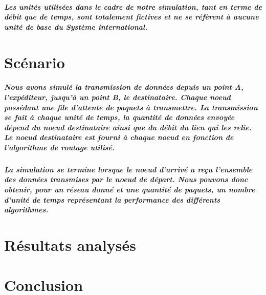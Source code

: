 \documentclass{report}
\begin{document}
\paragraph{Les unités utilisées dans le cadre de notre simulation, tant en terme de débit que de temps, sont totalement fictives et ne se réfèrent à aucune unité de base du Système international.}

\chapter{Scénario}

\paragraph{Nous avons simulé la transmission de données depuis un point A, l'expéditeur, jusqu'à un point B, le destinataire. Chaque noeud possédant une file d'attente de paquets à transmettre. La transmission se fait à chaque unité de temps, la quantité de données envoyée dépend du noeud destinataire ainsi que du débit du lien qui les relie. Le noeud destinataire est fourni à chaque noeud en fonction de l'algorithme de routage utilisé.}

\paragraph{La simulation se termine lorsque le noeud d'arrivé a reçu l'ensemble des données transmises par le noeud de départ. Nous pouvons donc obtenir, pour un réseau donné et une quantité de paquets, un nombre d'unité de temps représentant la performance des différents algorithmes.}

\paragraph{}

\chapter{Résultats analysés}

\paragraph{}

\chapter{Conclusion}

\paragraph{}
\end{document}
